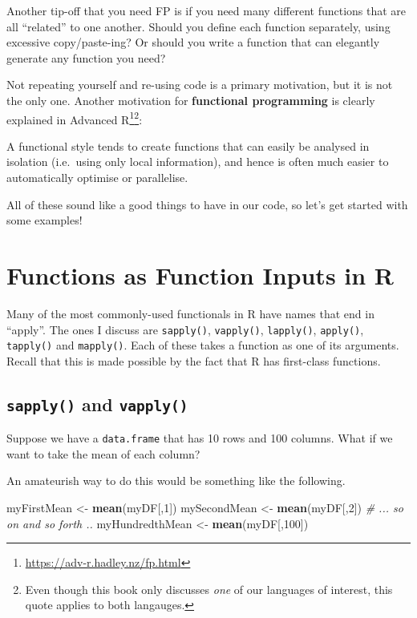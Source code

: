 \documentclass[12pt,krantz2]{krantz}
\makeatletter
\newenvironment{Shaded}{\begin{snugshade}}{\end{snugshade}}
\newcommand{\CommentTok}[1]{\textcolor[rgb]{0.37,0.37,0.37}{\textit{#1}}}
\newcommand{\DecValTok}[1]{\textcolor[rgb]{0.06,0.06,0.06}{#1}}
\newcommand{\KeywordTok}[1]{\textcolor[rgb]{0.27,0.27,0.27}{\textbf{#1}}}
\newcommand{\NormalTok}[1]{#1}
\newcommand{\StringTok}[1]{\textcolor[rgb]{0.5,0.5,0.5}{#1}}
\renewenvironment{quote}{\begin{VF}}{\end{VF}}
\renewcommand{\href}[2]{#2\footnote{\url{#1}}}
\newenvironment{kframe}{%
\medskip{}
\setlength{\fboxsep}{.8em}
 \def\at@end@of@kframe{}%
 \ifinner\ifhmode%
  \def\at@end@of@kframe{\end{minipage}}%
  \begin{minipage}{\columnwidth}%
 \fi\fi%
 \def\FrameCommand##1{\hskip\@totalleftmargin \hskip-\fboxsep
 \colorbox{shadecolor}{##1}\hskip-\fboxsep
     \hskip-\linewidth \hskip-\@totalleftmargin \hskip\columnwidth}%
 \MakeFramed {\advance\hsize-\width
   \@totalleftmargin\z@ \linewidth\hsize
   \@setminipage}}%
 {\par\unskip\endMakeFramed%
 \at@end@of@kframe}
\renewenvironment{Shaded}{\begin{kframe}}{\end{kframe}}
\makeatother
\begin{document}
Another tip-off that you need FP is if you need many different functions that are all ``related'' to one another. Should you define each function separately, using excessive copy/paste-ing? Or should you write a function that can elegantly generate any function you need?

Not repeating yourself and re-using code is a primary motivation, but it is not the only one. Another motivation for \textbf{functional programming} is clearly explained in \href{https://adv-r.hadley.nz/fp.html}{Advanced R}\footnote{Even though this book only discusses \emph{one} of our languages of interest, this quote applies to both langauges.}:

\begin{quote}
A functional style tends to create functions that can easily be analysed in isolation (i.e.~using only local information), and hence is often much easier to automatically optimise or parallelise.
\end{quote}

All of these sound like a good things to have in our code, so let's get started with some examples!

\hypertarget{functions-as-function-inputs-in-r}{%
\section{Functions as Function Inputs in R}\label{functions-as-function-inputs-in-r}}

Many of the most commonly-used functionals in R have names that end in ``apply''. The ones I discuss are \texttt{sapply()}, \texttt{vapply()}, \texttt{lapply()}, \texttt{apply()}, \texttt{tapply()} and \texttt{mapply()}. Each of these takes a function as one of its arguments. Recall that this is made possible by the fact that R has first-class functions.

\hypertarget{sapply-and-vapply}{%
\subsection{\texorpdfstring{\texttt{sapply()} and \texttt{vapply()}}{sapply() and vapply()}}\label{sapply-and-vapply}}

Suppose we have a \texttt{data.frame} that has 10 rows and 100 columns. What if we want to take the mean of each column?

An amateurish way to do this would be something like the following.

\begin{Shaded}
\begin{Highlighting}[]
\NormalTok{myFirstMean <-}\StringTok{ }\KeywordTok{mean}\NormalTok{(myDF[,}\DecValTok{1}\NormalTok{])}
\NormalTok{mySecondMean <-}\StringTok{ }\KeywordTok{mean}\NormalTok{(myDF[,}\DecValTok{2}\NormalTok{])}
\CommentTok{# ... so on and so forth ..}
\NormalTok{myHundredthMean <-}\StringTok{ }\KeywordTok{mean}\NormalTok{(myDF[,}\DecValTok{100}\NormalTok{])}
\end{Highlighting}
\end{Shaded}
\end{document}
